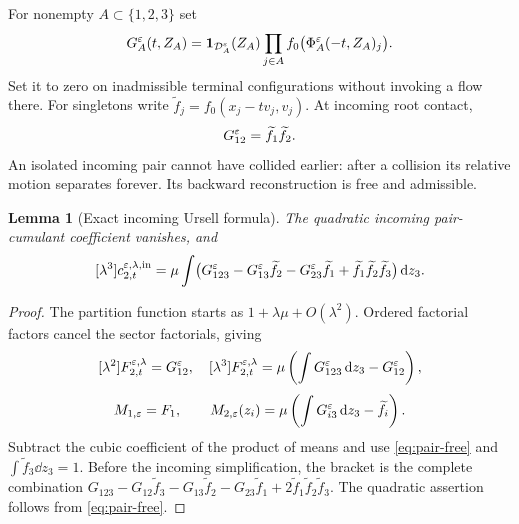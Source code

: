 \documentclass[11pt,letterpaper]{article}
\newtheorem{lemma}[theorem]{Lemma}
\theoremstyle{remark}\newtheorem{remark}[theorem]{Remark}
\numberwithin{equation}{section}
\begin{document}
For nonempty $A\subset\{1,2,3\}$ set
\[
 G_A^\varepsilon(t,Z_A)=\mathbf1_{\mathcal D_A^\varepsilon}(Z_A)
       \prod_{j\in A}f_0\bigl(\Phi_A^\varepsilon(-t,Z_A)_j\bigr).
\]
Set it to zero on inadmissible terminal configurations without invoking a flow there. For singletons write $\widetilde f_j=f_0(x_j-tv_j,v_j)$. At incoming root contact,
\begin{equation}\label{eq:pair-free}
 G_{12}^\varepsilon=\widetilde f_1\widetilde f_2.
\end{equation}
An isolated incoming pair cannot have collided earlier: after a collision its relative motion separates forever. Its backward reconstruction is free and admissible.

\begin{lemma}[Exact incoming Ursell formula]\label{lem:ursell}
The quadratic incoming pair-cumulant coefficient vanishes, and
\begin{equation}\label{eq:ursell}
 [\lambda^3]c_{2,t}^{\varepsilon,\lambda,\rm in}
 =\mu\int\bigl(G_{123}^\varepsilon-G_{13}^\varepsilon\widetilde f_2-G_{23}^\varepsilon\widetilde f_1
                   +\widetilde f_1\widetilde f_2\widetilde f_3\bigr)\,\mathrm d z_3.
\end{equation}
\end{lemma}
\begin{proof}
The partition function starts as $1+\lambda\mu+O(\lambda^2)$. Ordered factorial factors cancel the sector factorials, giving
\[
 [\lambda^2]F_{2,t}^{\varepsilon,\lambda}=G_{12}^\varepsilon,\quad
 [\lambda^3]F_{2,t}^{\varepsilon,\lambda}=\mu\left(\int G_{123}^\varepsilon\,\mathrm d z_3-G_{12}^\varepsilon\right),
\]
\[
 M_{1,\varepsilon}=F_1,\qquad
 M_{2,\varepsilon}(z_i)=\mu\left(\int G_{i3}^\varepsilon\,\mathrm d z_3-\widetilde f_i\right).
\]
Subtract the cubic coefficient of the product of means and use \eqref{eq:pair-free} and $\int\widetilde f_3\dd z_3=1$. Before the incoming simplification, the bracket is the complete combination
$G_{123}-G_{12}\widetilde f_3-G_{13}\widetilde f_2-G_{23}\widetilde f_1+2\widetilde f_1\widetilde f_2\widetilde f_3$.
The quadratic assertion follows from \eqref{eq:pair-free}.
\end{proof}
\end{document}
